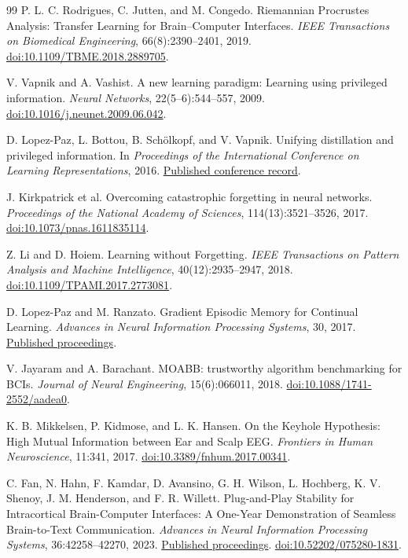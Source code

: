 \documentclass[11pt,a4paper]{article}
\begin{document}
\begin{thebibliography}{99}
P. L. C. Rodrigues, C. Jutten, and M. Congedo.
Riemannian Procrustes Analysis: Transfer Learning for Brain--Computer Interfaces.
\emph{IEEE Transactions on Biomedical Engineering}, 66(8):2390--2401, 2019.
\href{https://doi.org/10.1109/TBME.2018.2889705}{doi:10.1109/TBME.2018.2889705}.

V. Vapnik and A. Vashist.
A new learning paradigm: Learning using privileged information.
\emph{Neural Networks}, 22(5--6):544--557, 2009.
\href{https://doi.org/10.1016/j.neunet.2009.06.042}{doi:10.1016/j.neunet.2009.06.042}.

D. Lopez-Paz, L. Bottou, B. Sch\"olkopf, and V. Vapnik.
Unifying distillation and privileged information.
In \emph{Proceedings of the International Conference on Learning Representations}, 2016.
\href{https://www.iclr.cc/archive/www/2016.html}{Published conference record}.

J. Kirkpatrick et al.
Overcoming catastrophic forgetting in neural networks.
\emph{Proceedings of the National Academy of Sciences}, 114(13):3521--3526, 2017.
\href{https://doi.org/10.1073/pnas.1611835114}{doi:10.1073/pnas.1611835114}.

Z. Li and D. Hoiem.
Learning without Forgetting.
\emph{IEEE Transactions on Pattern Analysis and Machine Intelligence}, 40(12):2935--2947, 2018.
\href{https://doi.org/10.1109/TPAMI.2017.2773081}{doi:10.1109/TPAMI.2017.2773081}.

D. Lopez-Paz and M. Ranzato.
Gradient Episodic Memory for Continual Learning.
\emph{Advances in Neural Information Processing Systems}, 30, 2017.
\href{https://proceedings.nips.cc/paper_files/paper/2017/hash/f87522788a2be2d171666752f97ddebb-Abstract.html}{Published proceedings}.

V. Jayaram and A. Barachant.
MOABB: trustworthy algorithm benchmarking for BCIs.
\emph{Journal of Neural Engineering}, 15(6):066011, 2018.
\href{https://doi.org/10.1088/1741-2552/aadea0}{doi:10.1088/1741-2552/aadea0}.

K. B. Mikkelsen, P. Kidmose, and L. K. Hansen.
On the Keyhole Hypothesis: High Mutual Information between Ear and Scalp EEG.
\emph{Frontiers in Human Neuroscience}, 11:341, 2017.
\href{https://doi.org/10.3389/fnhum.2017.00341}{doi:10.3389/fnhum.2017.00341}.

C. Fan, N. Hahn, F. Kamdar, D. Avansino, G. H. Wilson, L. Hochberg, K. V. Shenoy, J. M. Henderson, and F. R. Willett.
Plug-and-Play Stability for Intracortical Brain-Computer Interfaces: A One-Year Demonstration of Seamless Brain-to-Text Communication.
\emph{Advances in Neural Information Processing Systems}, 36:42258--42270, 2023.
\href{https://proceedings.neurips.cc/paper_files/paper/2023/hash/83a14a36de4502bac5b580db36e81858-Abstract-Conference.html}{Published proceedings}. \href{https://doi.org/10.52202/075280-1831}{doi:10.52202/075280-1831}.


\end{thebibliography}
\end{document}
